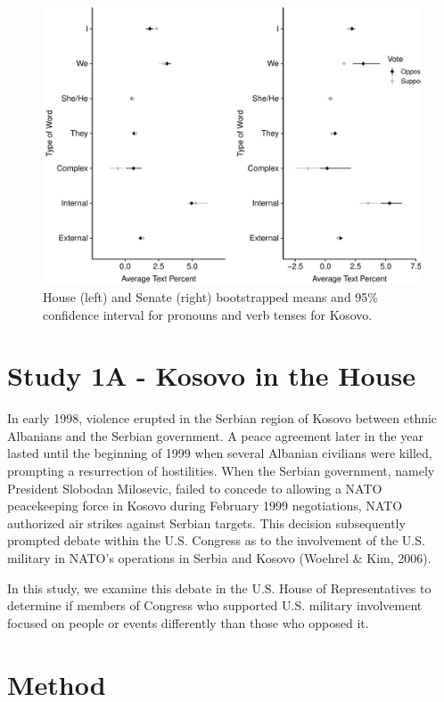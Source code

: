\documentclass[english,,man]{apa6}
\theoremstyle{definition}
\theoremstyle{definition}
\theoremstyle{definition}
\theoremstyle{remark}
\begin{document}
\begin{figure}
\centering
\includegraphics{Language_of_War_Markdown_KJ_files/figure-latex/Kpic-1.pdf}
\caption{\label{fig:Kpic}House (left) and Senate (right) bootstrapped means
and 95\% confidence interval for pronouns and verb tenses for Kosovo.}
\end{figure}

\hypertarget{study-1a---kosovo-in-the-house}{%
\section{Study 1A - Kosovo in the
House}\label{study-1a---kosovo-in-the-house}}

In early 1998, violence erupted in the Serbian region of Kosovo between
ethnic Albanians and the Serbian government. A peace agreement later in
the year lasted until the beginning of 1999 when several Albanian
civilians were killed, prompting a resurrection of hostilities. When the
Serbian government, namely President Slobodan Milosevic, failed to
concede to allowing a NATO peacekeeping force in Kosovo during February
1999 negotiations, NATO authorized air strikes against Serbian targets.
This decision subsequently prompted debate within the U.S. Congress as
to the involvement of the U.S. military in NATO's operations in Serbia
and Kosovo (Woehrel \& Kim, 2006).

In this study, we examine this debate in the U.S. House of
Representatives to determine if members of Congress who supported U.S.
military involvement focused on people or events differently than those
who opposed it.

\hypertarget{method-1}{%
\section{Method}\label{method-1}}
\end{document}

